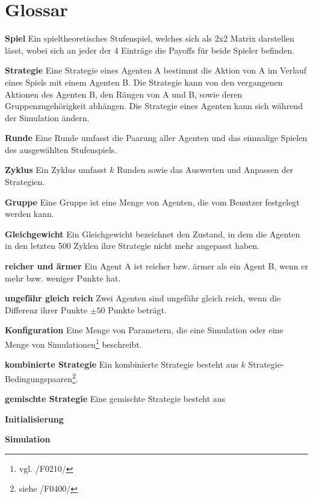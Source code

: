 \section{Glossar}

\textbf{Spiel}
Ein spieltheoretisches Stufenspiel, welches sich als 2x2 Matrix darstellen lässt, wobei sich an jeder der 4 Einträge die Payoffs für beide Spieler befinden.

\textbf{Strategie}
Eine Strategie eines Agenten A bestimmt die Aktion von A im Verlauf eines Spiels mit einem Agenten B. Die Strategie kann von den vergangenen Aktionen des Agenten B, den Rängen von A und B, sowie deren Gruppenzugehörigkeit abhängen. Die Strategie eines Agenten kann sich während der Simulation ändern.

\textbf{Runde}
Eine Runde umfasst die Paarung aller Agenten und das einmalige Spielen des ausgewählten Stufenspiels.

\textbf{Zyklus}
Ein Zyklus umfasst $k$ Runden sowie das Auswerten und Anpassen der Strategien.

\textbf{Gruppe}
Eine Gruppe ist eine Menge von Agenten, die vom Benutzer festgelegt werden kann.

\textbf{Gleichgewicht}
Ein Gleichgewicht bezeichnet den Zustand, in dem die Agenten in den letzten 500 Zyklen ihre Strategie nicht mehr angepasst haben.

\textbf{reicher und ärmer}
Ein Agent A ist reicher bzw. ärmer als ein Agent B, wenn er mehr bzw. weniger Punkte hat.

\textbf{ungefähr gleich reich}
Zwei Agenten sind ungefähr gleich reich, wenn die Differenz ihrer Punkte $\pm 50$ Punkte beträgt.

\textbf{Konfiguration}
Eine Menge von Parametern, die eine Simulation oder eine Menge von Simulationen\footnote{vgl. /F0210/} beschreibt.

\textbf{kombinierte Strategie}
Ein kombinierte Strategie besteht aus $k$ Strategie-Bedingungspaaren\footnote{siehe /F0400/}. 

\textbf{gemischte Strategie}
Eine gemischte Strategie besteht aus 

\textbf{Initialisierung}

\textbf{Simulation}

\textbf{}

\textbf{}